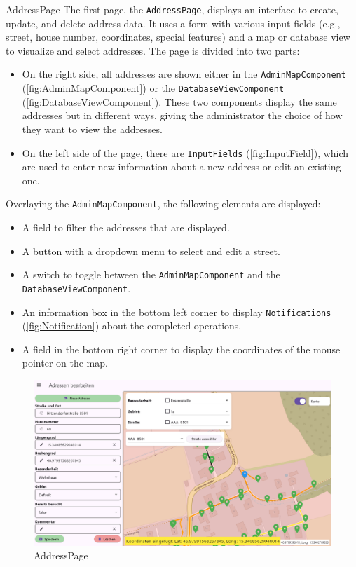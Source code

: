 \newpage

\begin{subsection}{AddressPage}
    \sloppy
    The first page, the \texttt{AddressPage}, displays an interface to create, update, and delete address data. It uses a form with various input fields (e.g., street, house number, coordinates, special features) and a map or database view to visualize and select addresses. The page is divided into two parts:

    \begin{itemize}
        \item On the right side, all addresses are shown either in the \texttt{AdminMapComponent} (\ref{fig:AdminMapComponent}) or the \texttt{DatabaseViewComponent} (\ref{fig:DatabaseViewComponent}). These two components display the same addresses but in different ways, giving the administrator the choice of how they want to view the addresses.
        \item On the left side of the page, there are \texttt{InputFields} (\ref{fig:InputField}), which are used to enter new information about a new address or edit an existing one.
    \end{itemize}

    Overlaying the \texttt{AdminMapComponent}, the following elements are displayed:

    \begin{itemize}
        \item A field to filter the addresses that are displayed.
        \item A button with a dropdown menu to select and edit a street.
        \item A switch to toggle between the \texttt{AdminMapComponent} and the \texttt{DatabaseViewComponent}.
        \item An information box in the bottom left corner to display \texttt{Notifications} (\ref{fig:Notification}) about the completed operations.
        \item A field in the bottom right corner to display the coordinates of the mouse pointer on the map.
    \end{itemize}
    

    \begin{figure}[H]
        \centering
        \includegraphics[width=1\linewidth]{images/AdminPanel/AddressPage.png}
        \caption{AddressPage}
    \end{figure}
\end{subsection}

